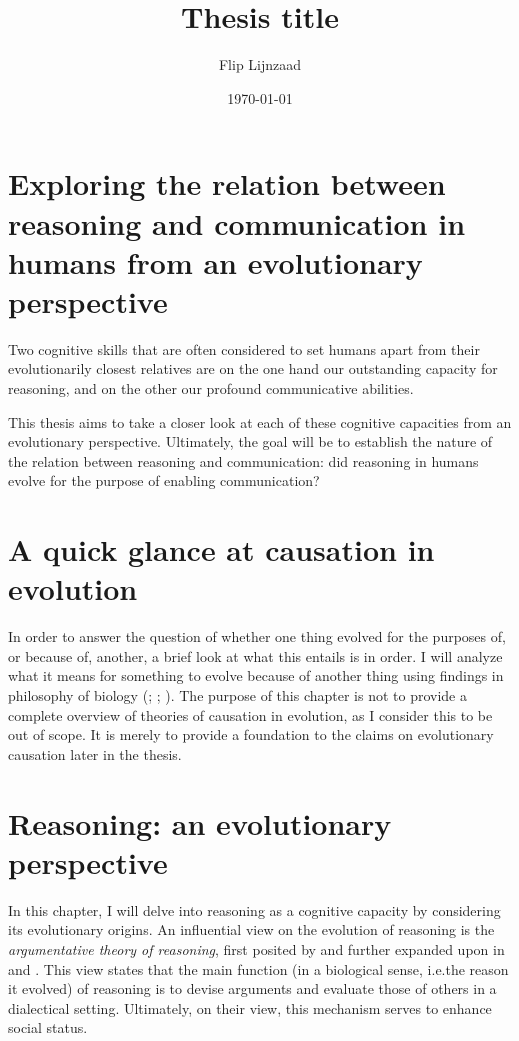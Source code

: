 \documentclass{article}
\title{Thesis title}
\author{Flip Lijnzaad}
\date{\today}
\begin{document}
\section*{\centering Exploring the relation between reasoning and communication in humans from an evolutionary perspective}

Two cognitive skills that are often considered to set humans apart from their evolutionarily closest relatives are on the one hand our outstanding capacity for reasoning, and on the other our profound communicative abilities.

This thesis aims to take a closer look at each of these cognitive capacities from an evolutionary perspective. Ultimately, the goal will be to establish the nature of the relation between reasoning and communication: did reasoning in humans evolve for the purpose of enabling communication?

\section{A quick glance at causation in evolution}

In order to answer the question of whether one thing evolved for the purposes of, or because of, another, a brief look at what this entails is in order.
I will analyze what it means for something to evolve because of another thing using findings in philosophy of biology (\citet{Ayala99}; \citet{Allen98}; \citet{Wright76}).
The purpose of this chapter is not to provide a complete overview of theories of causation in evolution, as I consider this to be out of scope. It is merely to provide a foundation to the claims on evolutionary causation later in the thesis.

\section{Reasoning: an evolutionary perspective}

In this chapter, I will delve into reasoning as a cognitive capacity by considering its evolutionary origins.
An influential view on the evolution of reasoning is the \emph{argumentative theory of reasoning}, first posited by \citet{MS11} and further expanded upon in \citet{Mercier16} and \citet{MS17}. This view states that the main function (in a biological sense, i.e.\@ the reason it evolved) of reasoning is to devise arguments and evaluate those of others in a dialectical setting. Ultimately, on their view, this mechanism serves to enhance social status.
\end{document}
